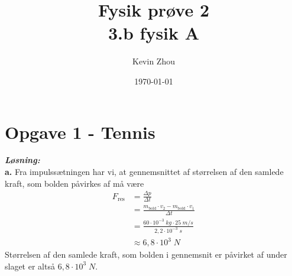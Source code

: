 \documentclass{report}
\title{Fysik prøve 2\\
{\Large \textbf{3.b fysik A}}}
\author{Kevin Zhou}
\date{\today}
\newcommand{\sol}{\setlength{\parindent}{0cm}\textbf{\textit{Løsning:}}\setlength{\parindent}{1cm}}
\begin{document}
\maketitle
\section*{Opgave 1 - Tennis}
\sol \\
\textbf{a.}
Fra impulssætningen har vi, at gennemsnittet af størrelsen af den samlede kraft, som bolden påvirkes af må være
\begin{equation*}
\begin{split}
  F _{\text{res} }&=\frac{\Delta p}{\Delta t}\\
  &=\frac{m_{\text{bold} } \cdot v_2 - m_{\text{bold} } \cdot v_1}{\Delta t}\\
  &=\frac{60 \cdot 10 ^{-3} \;\unit{kg} \cdot 25 \;\unit{m/s} }{2,2 \cdot 10 ^{-3} \;\unit{s} }\\
  &\approx 6,8 \cdot 10^3 \;\unit{N} 
\end{split}
\end{equation*}
Størrelsen af den samlede kraft, som bolden i gennemsnit er påvirket af under slaget er altså $6,8 \cdot 10^3 \;\unit{N} $.
\end{document}
